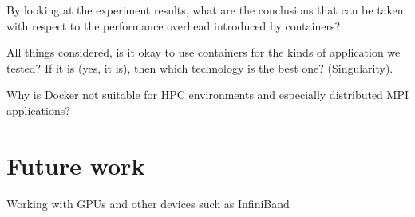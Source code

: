 \documentclass[12pt]{article}
\begin{document}
By looking at the experiment results, what are the conclusions that can be taken with respect to the performance overhead introduced by containers?

All things considered, is it okay to use containers for the kinds of application we tested? If it is (yes, it is), then which technology is the best one? (Singularity).

Why is Docker not suitable for HPC environments and especially distributed MPI applications? 

\section{Future work}
Working with GPUs and other devices such as InfiniBand



\end{document}
